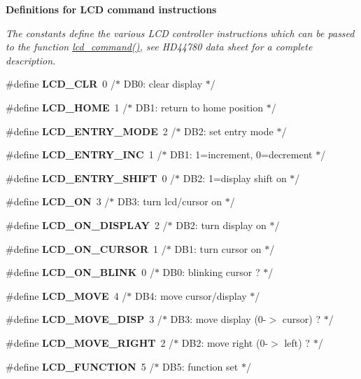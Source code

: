 \begin{Indent}{\bf Definitions for L\+CD command instructions}\par
{\em The constants define the various L\+CD controller instructions which can be passed to the function \hyperlink{a00006_gaea9d14f02df06f948cb5a56776980826}{lcd\+\_\+command()}, see H\+D44780 data sheet for a complete description. }\begin{DoxyCompactItemize}
\item 
\#define {\bfseries L\+C\+D\+\_\+\+C\+LR}~0 /$\ast$ D\+B0\+: clear display                  $\ast$/
\item 
\#define {\bfseries L\+C\+D\+\_\+\+H\+O\+ME}~1 /$\ast$ D\+B1\+: return to home position        $\ast$/
\item 
\#define {\bfseries L\+C\+D\+\_\+\+E\+N\+T\+R\+Y\+\_\+\+M\+O\+DE}~2 /$\ast$ D\+B2\+: set entry mode                 $\ast$/
\item 
\#define {\bfseries L\+C\+D\+\_\+\+E\+N\+T\+R\+Y\+\_\+\+I\+NC}~1 /$\ast$   D\+B1\+: 1=increment, 0=decrement     $\ast$/
\item 
\#define {\bfseries L\+C\+D\+\_\+\+E\+N\+T\+R\+Y\+\_\+\+S\+H\+I\+FT}~0 /$\ast$   D\+B2\+: 1=display shift on           $\ast$/
\item 
\#define {\bfseries L\+C\+D\+\_\+\+ON}~3 /$\ast$ D\+B3\+: turn lcd/cursor on             $\ast$/
\item 
\#define {\bfseries L\+C\+D\+\_\+\+O\+N\+\_\+\+D\+I\+S\+P\+L\+AY}~2 /$\ast$   D\+B2\+: turn display on              $\ast$/
\item 
\#define {\bfseries L\+C\+D\+\_\+\+O\+N\+\_\+\+C\+U\+R\+S\+OR}~1 /$\ast$   D\+B1\+: turn cursor on               $\ast$/
\item 
\#define {\bfseries L\+C\+D\+\_\+\+O\+N\+\_\+\+B\+L\+I\+NK}~0 /$\ast$     D\+B0\+: blinking cursor ?          $\ast$/
\item 
\#define {\bfseries L\+C\+D\+\_\+\+M\+O\+VE}~4 /$\ast$ D\+B4\+: move cursor/display            $\ast$/
\item 
\#define {\bfseries L\+C\+D\+\_\+\+M\+O\+V\+E\+\_\+\+D\+I\+SP}~3 /$\ast$   D\+B3\+: move display (0-\/$>$ cursor) ?  $\ast$/
\item 
\#define {\bfseries L\+C\+D\+\_\+\+M\+O\+V\+E\+\_\+\+R\+I\+G\+HT}~2 /$\ast$   D\+B2\+: move right (0-\/$>$ left) ?      $\ast$/
\item 
\#define {\bfseries L\+C\+D\+\_\+\+F\+U\+N\+C\+T\+I\+ON}~5 /$\ast$ D\+B5\+: function set                   $\ast$/
\item 

\end{DoxyCompactItemize}
\end{Indent}
